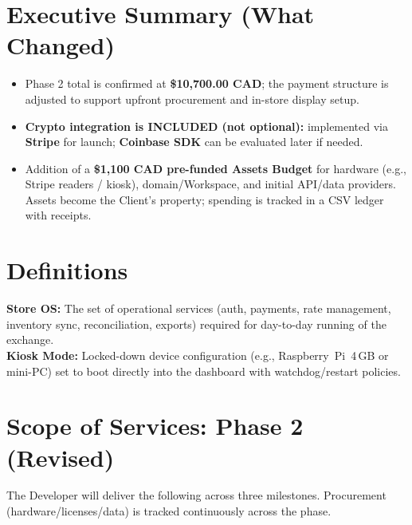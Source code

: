\documentclass[11pt, a4paper]{article}
\begin{document}
\section*{Executive Summary (What Changed)}
\begin{itemize}[leftmargin=*]
  \item Phase 2 total is confirmed at \textbf{\$10{,}700.00 CAD}; the payment structure is adjusted to support upfront procurement and in-store display setup.
  \item \textbf{Crypto integration is INCLUDED (not optional):} implemented via \textbf{Stripe} for launch; \textbf{Coinbase SDK} can be evaluated later if needed.
  \item Addition of a \textbf{\$1,100 CAD pre-funded Assets Budget} for hardware (e.g., Stripe readers / kiosk), domain/Workspace, and initial API/data providers. Assets become the Client’s property; spending is tracked in a CSV ledger with receipts.
\end{itemize}

\section*{Definitions}
\textbf{Store OS:} The set of operational services (auth, payments, rate management, inventory sync, reconciliation, exports) required for day-to-day running of the exchange. \\
\textbf{Kiosk Mode:} Locked-down device configuration (e.g., Raspberry~Pi~4\,GB or mini-PC) set to boot directly into the dashboard with watchdog/restart policies.

\section{Scope of Services: Phase 2 (Revised)}
The Developer will deliver the following across three milestones. Procurement (hardware/licenses/data) is tracked continuously across the phase.
\end{document}
